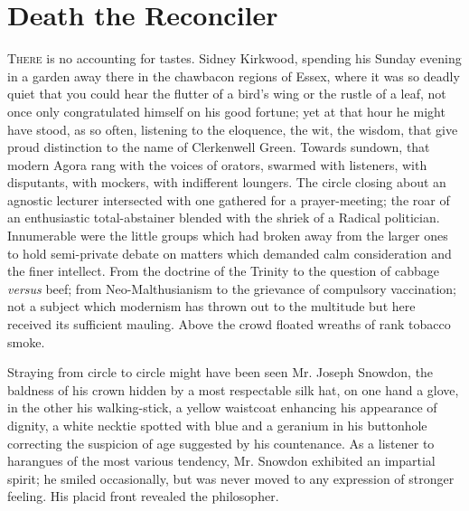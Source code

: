 \chapter{Death the Reconciler}

\textsc{There} is no accounting for tastes. Sidney Kirkwood, spending
his Sunday evening in a garden away there in the chawbacon regions of
Essex, where it was so deadly quiet that you could hear the flutter of a
bird's wing or the rustle of a leaf, not once only congratulated himself
on his good fortune; yet at that hour he might have stood, as so often,
listening to the eloquence, the wit, the wisdom, that give proud
distinction to the name of Clerkenwell Green. Towards sundown, that
modern Agora rang with the voices of orators, swarmed with listeners,
with disputants, with mockers, with indifferent loungers. The circle
closing about an agnostic lecturer intersected with one gathered for a
prayer-meeting; the roar of an enthusiastic {}total-abstainer blended
with the shriek of a Radical politician. Innumerable were the little
groups which had broken away from the larger ones to hold semi-private
debate on matters which demanded calm consideration and the finer
intellect. From the doctrine of the Trinity to the question of cabbage
\emph{versus} beef; from Neo-Malthusianism to the grievance of
compulsory vaccination; not a subject which modernism has thrown out to
the multitude but here received its sufficient mauling. Above the crowd
floated wreaths of rank tobacco smoke.

Straying from circle to circle might have been seen Mr. Joseph Snowdon,
the baldness of his crown hidden by a most respectable silk hat, on one
hand a glove, in the other his walking-stick, a yellow waistcoat
enhancing his appearance of dignity, a white necktie spotted with blue
and a geranium in his buttonhole correcting the suspicion of age
suggested by his countenance. As a listener to harangues of the most
various tendency, Mr. Snowdon exhibited an impartial spirit; {}he smiled
occasionally, but was never moved to any expression of stronger feeling.
His placid front revealed the philosopher.

